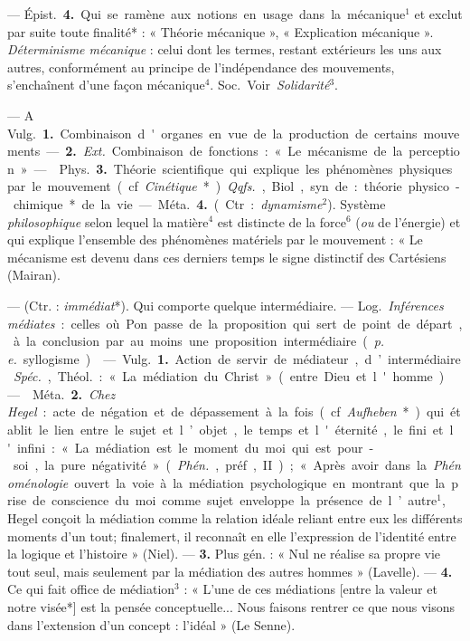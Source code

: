 \begin{itemize}[leftmargin=1cm, label=, itemsep=1pt]
— \si{Épist.} {\bf 4.} Qui se ramène aux notions en usage dans la
mécanique$^1$ et exclut par suite toute finalité* : « Théorie mécanique »,
« Explication mécanique ». {\it Déterminisme mécanique} : celui dont les
termes, restant extérieurs les uns aux autres, conformément au principe de
l’indépendance des mouvements, s’enchaînent d’une façon mécanique$^4$.
\si{Soc.} Voir {\it Solidarité}$^3$.

 — A \si{Vulg.} {\bf 1.} Combinaison d'organes en vue de la
production de certains mouvements. —  {\bf 2.} {\it Ext.} Combinaison de
fonctions : « Le mécanisme de la perception ».

—  \si{Phys.} {\bf 3.} Théorie scientifique qui explique les
phénomènes physiques par le mouvement (cf. {\it Cinétique}*). {\it Qqfs.},
Biol, syn. de : théorie physico-chimique* de la vie. — \si{Méta.} {\bf 4.}
(Ctr. : {\it dynamisme}$^2$). Système {\it philosophique} selon lequel la
matière$^4$ est distincte de la force$^6$ ({\it ou} de l'énergie) et qui
explique
l’ensemble des phénomènes matériels par le mouvement : « Le mécanisme est
devenu dans ces derniers temps le signe distinctif des Cartésiens (Mairan).

 — (Ctr. : {\it immédiat}*). Qui comporte quelque intermédiaire. —
\si{Log.} {\it Inférences médiates} : celles où Pon passe de la proposition
qui sert de point de départ, à la conclusion par au moins une proposition
intermédiaire ({\it p. e.} syllogisme).

 — \si{Vulg.} {\bf 1.} Action de servir de médiateur,
d’intermédiaire. {\it Spéc.}, \si{Théol.} : « La médiation du Christ » (entre
Dieu et l'homme).

—  \si{Méta.} {\bf 2.} {\it Chez Hegel} : acte de négation et
de dépassement à la fois (cf. {\it Aufheben}*) qui établit le lien entre le
sujet et l’objet, le temps et l'éternité, le fini et l'infini : « La
médiation est le moment du moi qui est pour-soi, la pure négativité »
({\it Phén.}, préf., II) ; « Après avoir dans la {\it Phénoménologie} ouvert
la voie à la médiation psychologique en montrant que la prise de conscience
du moi comme sujet enveloppe la présence de l’autre$^1$, Hegel conçoit la
médiation comme la relation idéale reliant entre eux les différents moments
d’un tout; finalemert, il reconnaît en elle l'expression de l'identité entre
la logique et l’histoire » (Niel). — {\bf 3.} Plus gén. : « Nul ne réalise sa
propre vie tout seul, mais seulement par la médiation des autres
hommes » (Lavelle). —  {\bf 4.} Ce qui fait office de
médiation$^3$ : « L’une de ces médiations [entre la valeur et notre visée*]
est la pensée conceptuelle... Nous faisons rentrer ce que nous visons dans
l’extension d’un concept : l’idéal » (Le Senne).


\end{itemize}
